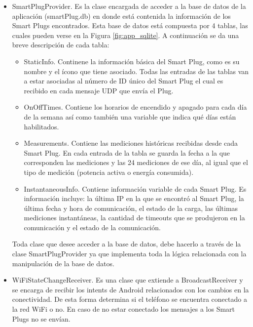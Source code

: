 \begin{itemize}
\item SmartPlugProvider. Es la clase encargada de acceder a la base de datos de la aplicación (smartPlug.db) en donde está contenida la información de los Smart Plugs encontrados. Esta base de datos está compuesta por 4 tablas, las cuales pueden verse en la Figura \ref{fig:app_sqlite}. A continuación se da una breve descripción de cada tabla:

\begin{itemize}
\item StaticInfo. Continene la información básica del Smart Plug, como es su nombre y el ícono que tiene asociado. Todas las entradas de las tablas van a estar asociadas al número de ID único del Smart Plug el cual es recibido en cada mensaje UDP que envía el Plug.
\item OnOffTimes. Contiene los horarios de encendido y apagado para cada día de la semana así como también una variable que indica qué días están habilitados.
\item Measurements. Contiene las mediciones históricas recibidas desde cada Smart Plug. En cada entrada de la tabla se guarda la fecha a la que corresponden las mediciones y las 24 mediciones de ese día, al igual que el tipo de medición (potencia activa o energía consumida).
\item InstantaneousInfo. Contiene información variable de cada Smart Plug. Es información incluye: la última IP en la que se encontró al Smart Plug, la última fecha y hora de comunicación, el estado de la carga, las últimas mediciones instantáneas, la cantidad de timeouts que se produjeron en la comunicación y el estado de la comunicación.
\end{itemize}

Toda clase que desee acceder a la base de datos, debe hacerlo a través de la clase SmartPlugProvider ya que implementa toda la lógica relacionada con la manipulación de la base de datos.

\item WiFiStateChangeReceiver. Es una clase que extiende a BroadcastReceiver y se encarga de recibir los intents de Android relacionados con los cambios en la conectividad. De esta forma determina si el teléfono se encuentra conectado a la red WiFi o no. En caso de no estar conectado los mensajes a los Smart Plugs no se envían.

\end{itemize}


